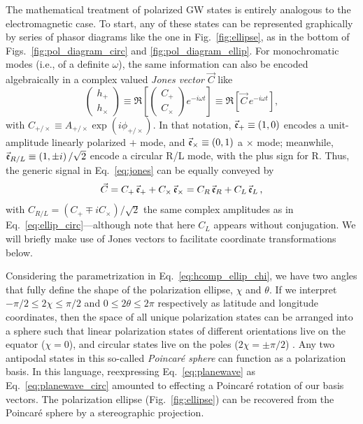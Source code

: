 \documentclass[aps,prd,twocolumn,superscriptaddress,preprintnumbers,floatfix,nofootinbib]{revtex4-2}
\newcommand{\beq}{\begin{equation}}
\newcommand{\eeq}{\end{equation}}
\newcommand*{\eq}[1]{Eq.~\eqref{eq:#1}}
\begin{document}
The mathematical treatment of polarized GW states is entirely analogous to the electromagnetic case.
To start, any of these states can be represented graphically by series of phasor diagrams like the one in Fig.~\ref{fig:ellipse}, as in the bottom of Figs.~\ref{fig:pol_diagram_circ} and \ref{fig:pol_diagram_ellip}.
For monochromatic modes (i.e., of a definite $\omega$), the same information can also be encoded algebraically in a complex valued \emph{Jones vector} $\vec{C}$ like 
\beq \label{eq:jones}
\begin{pmatrix}
h_+\\
h_\times
\end{pmatrix} \equiv
\Re \left[ \begin{pmatrix}
C_+\\
C_\times
\end{pmatrix} e^{-i\omega t}\right] \equiv
\Re \left[ \vec{C}\, e^{-i\omega t}\right] ,
\eeq
with $C_{+/\times} \equiv A_{+/\times} \exp(i\phi_{+/\times})$.
In that notation, $ \vec{\mathfrak{e}}_+ \equiv \left(1, 0\right)$ encodes a unit-amplitude linearly polarized $+$ mode, and $\vec{\mathfrak{e}}_\times \equiv \left(0,1\right)$ a $\times$ mode; meanwhile, $\vec{\mathfrak{e}}_{R/L} \equiv \left(1,\pm i\right)/\sqrt{2}$ encode a circular R/L mode, with the plus sign for R.
Thus, the generic signal in \eq{jones} can be equally conveyed by
\beq \label{eq:jones_bases}
\vec{C} = C_+ \, \jonesbasis_+ + C_\times \, \jonesbasis_\times = C_R \, \jonesbasis_R + C_L \, \jonesbasis_L\, ,
\eeq
with $C_{R/L} = (C_+ \mp i C_\times)/\sqrt{2}$ the same complex amplitudes as in \eq{ellip_circ}---although note that here $C_L$ appears without conjugation.
We will briefly make use of Jones vectors to facilitate coordinate transformations below.


Considering the parametrization in \eq{hcomp_ellip_chi}, we have two angles that fully define the shape of the polarization ellipse, $\chi$ and $\theta$.
If we interpret $-\pi/2 \leq 2\chi \leq \pi/2$ and $0 \leq 2\theta \leq 2\pi$ respectively as latitude and longitude coordinates, then the space of all unique polarization states can be arranged into a sphere such that linear polarization states of different orientations live on the equator ($\chi = 0$), and circular states live on the poles ($2\chi = \pm \pi/2$) \cite{poincare,goldstein}.
Any two antipodal states in this so-called \emph{Poincar\'e sphere} can function as a polarization basis.
In this language, reexpressing Eq.~\eqref{eq:planewave} as Eq.~\eqref{eq:planewave_circ} amounted to effecting a Poincar\'{e} rotation of our basis vectors.
The polarization ellipse (Fig.~\ref{fig:ellipse}) can be recovered from the Poincar\'e sphere by a stereographic projection.
\end{document}
